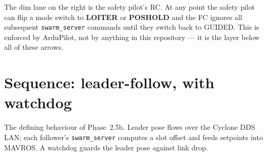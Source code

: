 \documentclass[11pt,a4paper]{article}
\begin{document}
\vspace{0.5em}

\begin{tcolorbox}[colback=lightaccent, colframe=fcblue, arc=2pt, boxrule=0.4pt,
                  title={\small\bfseries Safety lane}, fonttitle=\color{fcblue}]
The dim lane on the right is the safety pilot's RC. At any point the safety pilot can
flip a mode switch to \textbf{LOITER} or \textbf{POSHOLD} and the FC ignores all
subsequent \texttt{swarm\_server} commands until they switch back to GUIDED. This is
enforced by ArduPilot, not by anything in this repository --- it is the layer below all
of these arrows.
\end{tcolorbox}

\newpage

\section{Sequence: leader-follow, with watchdog}

The defining behaviour of Phase~2.5b. Leader pose flows over the
Cyclone DDS LAN; each follower's \texttt{swarm\_server} computes a slot
offset and feeds setpoints into MAVROS. A watchdog guards the leader
pose against link drop.
\end{document}
